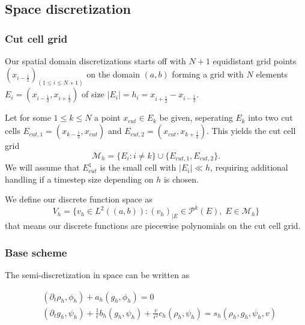 \documentclass[]{article}
\begin{document}
\subsection{Space discretization}

\subsubsection{Cut cell grid}

Our spatial domain discretizations starts off with $N+1$ equidistant grid points $(x_{i - \frac{1}{2}})_{(1 \le i \le N + 1)}$ on the domain $(a, b)$ forming a grid with $N$ elements  $E_i = (x_{i - \frac{1}{2}}, x_{i + \frac{1}{2}})$ of size $|E_i| = h_i = x_{i + \frac{i}{2}} - x_{i - \frac{1}{2}}$.

Let for some $1 \le k \le N$ a point $x_{cut} \in E_k$  be given, seperating $E_k$ into two cut cells $E_{cut, 1} = (x_{k - \frac{1}{2}}, x_{cut})$ and $E_{cut, 2} = (x_{cut}, x_{k + \frac{1}{2}})$.  This yields the cut cell grid
\[
\mathcal{M}_h = \{ E_i : i \neq k\} \cup \{ E_{cut, 1}, E_{cut, 2} \}.
\]
We will assume that $E_{cut}^1$ is the small cell with $|E_i| \ll h$, requiring additional handling if a timestep size depending on $h$ is chosen.

We define our discrete function space as
\[
V_h = \{ v_h \in L^2((a, b)) : (v_h)_{|E} \in \mathcal{P}^k(E), \; E \in \mathcal{M}_h \}
\]
that means our discrete functions are piecewise polynomials on the cut cell grid.

\subsubsection{Base scheme}

The semi-discretization in space can be written as

\begin{subequations}
\begin{align}
& (\partial_t \rho_h, \phi_h) + a_h(g_h, \phi_h) = 0\\
& (\partial_t g_h, \psi_h) + \frac{1}{\epsilon}b_h(g_h, \psi_h) + \frac{v}{\epsilon^2}c_h(\rho_h, \psi_h) = s_h(\rho_h, g_h, \psi_h, v)
\end{align}
\end{subequations}
\end{document}
